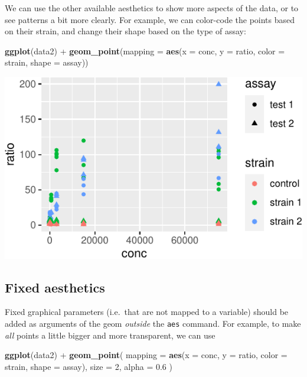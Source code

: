\documentclass[]{book}
\newenvironment{Shaded}{}{}
\newcommand{\DataTypeTok}[1]{\textcolor[rgb]{0.56,0.13,0.00}{#1}}
\newcommand{\DecValTok}[1]{\textcolor[rgb]{0.25,0.63,0.44}{#1}}
\newcommand{\FloatTok}[1]{\textcolor[rgb]{0.25,0.63,0.44}{#1}}
\newcommand{\KeywordTok}[1]{\textcolor[rgb]{0.00,0.44,0.13}{\textbf{#1}}}
\newcommand{\NormalTok}[1]{#1}
\newcommand{\OperatorTok}[1]{\textcolor[rgb]{0.40,0.40,0.40}{#1}}
\newcommand{\StringTok}[1]{\textcolor[rgb]{0.25,0.44,0.63}{#1}}
\begin{document}
We can use the other available aesthetics to show more aspects of the data, or to see patterns a bit more clearly. For example, we can color-code the points based on their strain, and change their shape based on the type of assay:

\begin{Shaded}
\begin{Highlighting}[]
\KeywordTok{ggplot}\NormalTok{(data2) }\OperatorTok{+}
\StringTok{  }\KeywordTok{geom_point}\NormalTok{(}\DataTypeTok{mapping =} \KeywordTok{aes}\NormalTok{(}\DataTypeTok{x =}\NormalTok{ conc, }\DataTypeTok{y =}\NormalTok{ ratio, }\DataTypeTok{color =}\NormalTok{ strain, }\DataTypeTok{shape =}\NormalTok{ assay))}
\end{Highlighting}
\end{Shaded}

\begin{center}\includegraphics[width=\textwidth]{TRES-Tidy-Tutorial_files/figure-latex/unnamed-chunk-110-1} \end{center}

\hypertarget{fixed-aesthetics}{%
\subsection{Fixed aesthetics}\label{fixed-aesthetics}}

Fixed graphical parameters (i.e.~that are not mapped to a variable) should be added as arguments of the geom \emph{outside} the \texttt{aes} command. For example, to make \emph{all} points a little bigger and more transparent, we can use

\begin{Shaded}
\begin{Highlighting}[]
\KeywordTok{ggplot}\NormalTok{(data2) }\OperatorTok{+}
\StringTok{  }\KeywordTok{geom_point}\NormalTok{(}
    \DataTypeTok{mapping =} \KeywordTok{aes}\NormalTok{(}\DataTypeTok{x =}\NormalTok{ conc, }\DataTypeTok{y =}\NormalTok{ ratio, }\DataTypeTok{color =}\NormalTok{ strain, }\DataTypeTok{shape =}\NormalTok{ assay),}
    \DataTypeTok{size =} \DecValTok{2}\NormalTok{, }\DataTypeTok{alpha =} \FloatTok{0.6}
\NormalTok{  )}
\end{Highlighting}
\end{Shaded}
\end{document}
